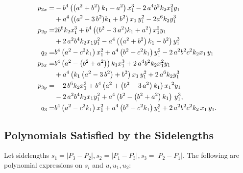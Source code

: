 \begin{align*}
\small
p_{2x}=&-{b}^{4} \left(  \left(   a^2+{b}^{2}\right)k_1 -{a}^{2}  \right) x_1^{3}-2\,{a}^{4}{b}^{2} k_2  x_1^{2}{y_1}\\
&+{a}^{4} \left(  ({a
}^{2}-3\, {b}^{2})k_1+{b}^{2}
 \right) {x_1}\,y_1^{2}-2{a}^{6} k_2 y_1^{3}\\
p_{2y}=& 2{b}^{6} k_2 x_1^{3}+{b}^{4}\left(  ({b
 }^{2}-3\, {a}^{2}) k_1  +{a}^{2}
  \right) x_1^{2}{y_1}\\
&+  2\,{a}^{2} {b}^{4}k_2 {x_1} y_1^{2} -{
a}^{4}  \left(  \left(   a^2+{b}^{2}\right)k_1  -{b}^{2}  \right)  y_1^{3}
\\
q_2=&{b}^{4} \left( a^2-c^2k_1   \right)
x_1^{2}+{a}^{4} \left(  {b}^{2}+c^2k_1  
 \right) y_1^{2} - 2\, {a}^{2}{b}^{2}{c^2}k_2 {x_1}\,{
y_1} \\
p_{3x}=& {b}^{4} \left( {a}^{2}- \left( {b}^{2}+{a}^{2} \right) \right)
 k_1  x_1^{3} +2\,{a}^{4}{b}^{2}k_2  x_1^{2}{ y_1}\\
 &+{a}^{4} \left( 
  k_1 \left( {a}^{2}-3\,{b}^{2}
 \right) +{b}^{2} \right) { x_1}\, y_1^{2} +2\, {a}^{6} k_2 y_1^{3}
\\
p_{3y}=& -2\, {b}^{6} k_2 x_1^{3}+{b}^{4} \left( {a}^{2}+ \left( {b}^{2}-3\,{a}^{2} \right)    k_1 \right) {{ x_1}}^{2}{ y_1}
\\
& -2\,{a}^{2}  {b}^{4} k_2  x_1 y_1^{2}+
 {a}^{4} \left( {b}^{2}- \left( {b}^{2}+{a}^{2} \right)   k_1 \right)\,  y_1^{3},
\\
q_3=& {b}^{4} \left( {a}^{2}-{c^2}k_1   \right) x_1^{2}+{a}^{4} \left( {b}^{2}+c^2k_1  \right)  y_1^{2}+2\,{a}^{2}{b}^{
2} c^2 k_2\, { x_1}\,{ y_1}.
\end{align*}

\subsection{Polynomials Satisfied by the Sidelengths}
\label{app:alg_locus}

Let sidelengths $s_1=|P_3-P_2|, s_2=|P_1-P_3|,s_3=|P_2-P_1|$. The following are polynomial expressions on $s_i$ and $u,u_1,u_2$:

